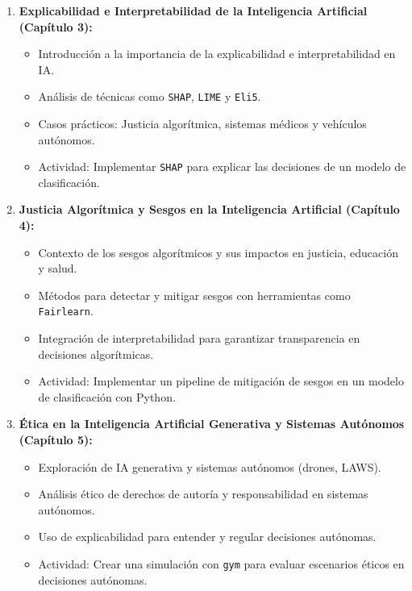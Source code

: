 \begin{refsection}
\begin{enumerate}
\item \textbf{Explicabilidad e Interpretabilidad de la Inteligencia Artificial (Capítulo 3):}  
\begin{itemize}
    \item Introducción a la importancia de la explicabilidad e interpretabilidad en IA.
    \item Análisis de técnicas como \texttt{SHAP}, \texttt{LIME} y \texttt{Eli5}.
    \item Casos prácticos: Justicia algorítmica, sistemas médicos y vehículos autónomos.
    \item Actividad: Implementar \texttt{SHAP} para explicar las decisiones de un modelo de clasificación.
\end{itemize}


\item \textbf{Justicia Algorítmica y Sesgos en la Inteligencia Artificial (Capítulo 4):}  
\begin{itemize}
    \item Contexto de los sesgos algorítmicos y sus impactos en justicia, educación y salud.
    \item Métodos para detectar y mitigar sesgos con herramientas como \texttt{Fairlearn}.
    \item Integración de interpretabilidad para garantizar transparencia en decisiones algorítmicas.
    \item Actividad: Implementar un pipeline de mitigación de sesgos en un modelo de clasificación con Python.
\end{itemize}



\item \textbf{Ética en la Inteligencia Artificial Generativa y Sistemas Autónomos (Capítulo 5):}  
\begin{itemize}
    \item Exploración de IA generativa y sistemas autónomos (drones, LAWS).
    \item Análisis ético de derechos de autoría y responsabilidad en sistemas autónomos.
    \item Uso de explicabilidad para entender y regular decisiones autónomas.
    \item Actividad: Crear una simulación con \texttt{gym} para evaluar escenarios éticos en decisiones autónomas.
\end{itemize}


\end{enumerate}
\end{refsection}
